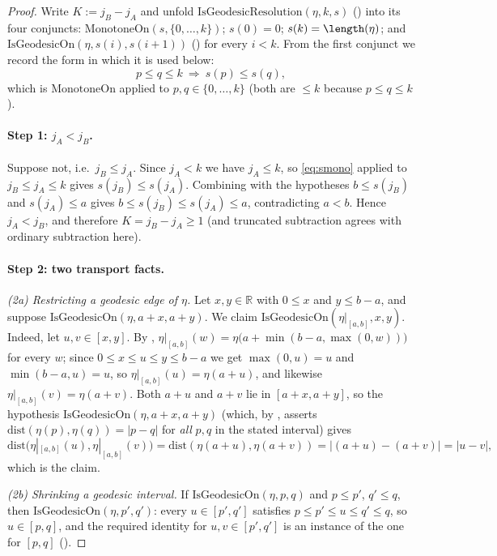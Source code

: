\begin{proof}
  Write $K := j_B - j_A$ and unfold $\mathrm{IsGeodesicResolution}(\eta,k,s)$
  () into its four conjuncts: $\mathrm{MonotoneOn}(s,\{0,\dots,k\})$;
  $s(0)=0$; $s(k)=\length(\eta)$; and $\mathrm{IsGeodesicOn}(\eta,s(i),s(i+1))$
  () for every $i<k$. From the first conjunct we record the form in which it
  is used below:
  \begin{equation}\label{eq:smono}
    p \le q \le k \ \Longrightarrow\ s(p) \le s(q),
  \end{equation}
  which is $\mathrm{MonotoneOn}$ applied to $p,q \in \{0,\dots,k\}$ (both are $\le k$ because $p
  \le q \le k$).

  \paragraph{Step 1: $j_A < j_B$.} Suppose not, i.e.\ $j_B \le j_A$. Since $j_A < k$ we have $j_A
  \le k$, so \eqref{eq:smono} applied to $j_B \le j_A \le k$ gives $s(j_B) \le s(j_A)$. Combining
  with the hypotheses $b \le s(j_B)$ and $s(j_A) \le a$ gives $b \le s(j_B) \le s(j_A) \le a$,
  contradicting $a<b$. Hence $j_A<j_B$, and therefore $K = j_B-j_A \ge 1$ (and truncated
  subtraction agrees with ordinary subtraction here).

  \paragraph{Step 2: two transport facts.} \emph{(2a) Restricting a geodesic edge of $\eta$.} Let
  $x,y \in \mathbb{R}$ with $0 \le x$ and $y \le b-a$, and suppose
  $\mathrm{IsGeodesicOn}(\eta,a+x,a+y)$. We claim
  $\mathrm{IsGeodesicOn}(\eta|_{[a,b]},x,y)$. Indeed, let $u,v \in [x,y]$. By
  , $\eta|_{[a,b]}(w) = \eta\bigl(a+\min(b-a,\max(0,w))\bigr)$ for every
  $w$; since $0 \le x \le u \le y \le b-a$ we get $\max(0,u)=u$ and $\min(b-a,u)=u$, so
  $\eta|_{[a,b]}(u) = \eta(a+u)$, and likewise $\eta|_{[a,b]}(v) = \eta(a+v)$. Both $a+u$ and $a+v$
  lie in $[a+x,a+y]$, so the hypothesis $\mathrm{IsGeodesicOn}(\eta,a+x,a+y)$ (which, by
  , asserts $\mathrm{dist}(\eta(p),\eta(q)) = |p-q|$ for \emph{all} $p,q$ in
  the stated interval) gives
  \[
    \mathrm{dist}\bigl(\eta|_{[a,b]}(u),\eta|_{[a,b]}(v)\bigr) = \mathrm{dist}(\eta(a+u),\eta(a+v))
      = |(a+u)-(a+v)| = |u-v| ,
  \]
  which is the claim.

  \emph{(2b) Shrinking a geodesic interval.} If $\mathrm{IsGeodesicOn}(\eta,p,q)$ and $p \le p'$,
  $q' \le q$, then $\mathrm{IsGeodesicOn}(\eta,p',q')$: every $u \in [p',q']$ satisfies $p \le p'
  \le u \le q' \le q$, so $u \in [p,q]$, and the required identity for $u,v \in [p',q']$ is an
  instance of the one for $[p,q]$ ().


\end{proof}
